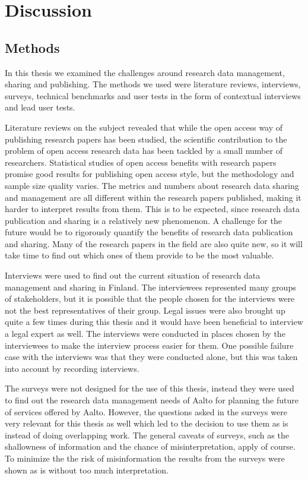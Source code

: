 \chapter{Discussion}
\label{chapter:discussion}

\section{Methods}

In this thesis we examined the challenges around research data management,
sharing and publishing. The methods we used were literature reviews,
interviews, surveys, technical benchmarks and user tests in the form of contextual
interviews and lead user tests.

Literature reviews on the subject revealed that while the open access way of
publishing research papers has been studied, the scientific contribution to
the problem of open access research data has been tackled by a small number
of researchers. Statistical studies of open access benefits with research
papers promise good results for publishing open access style, but the
methodology and sample size quality varies. The metrics and numbers about
research data sharing and management are all different within the research
papers published, making it harder to interpret results from them. This is to
be expected, since research data publication and sharing is a relatively new
phenomenon. A challenge for the future would be to rigorously quantify the
benefits of research data publication and sharing. Many of the research papers
in the field are also quite new, so it will take time to find out which ones
of them provide to be the most valuable.

Interviews were used to find out the current situation of research data
management and sharing in Finland. The interviewees represented many groups
of stakeholders, but it is possible that the people chosen for the interviews
were not the best representatives of their group. Legal issues were also
brought up quite a few times during this thesis and it would have been
beneficial to interview a legal expert as well. The interviews were conducted
in places chosen by the interviewees to make the interview process easier
for them. One possible failure case with the interviews was that they were
conducted alone, but this was taken into account by recording interviews.

The surveys were not designed for the use of this thesis, instead they were used
to find out the research data management needs of Aalto for planning the
future of services offered by Aalto. However, the questions asked in the
surveys were very relevant for this thesis as well which led to the decision
to use them as is instead of doing overlapping work. The general caveats of
surveys, such as the shallowness of information and the chance of
misinterpretation, apply of course. To minimize the the risk of misinformation
the results from the surveys were shown as is without too much interpretation.

